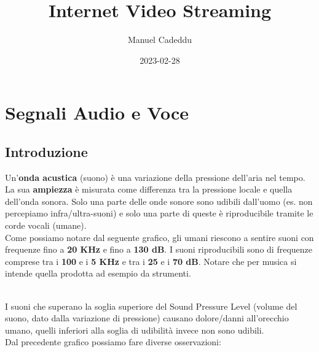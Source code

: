 \documentclass{article}
\title{Internet Video Streaming}
\date{2023-02-28}
\author{Manuel Cadeddu}
\begin{document}
	\maketitle
	\newpage
	\doublespacing
	\tableofcontents
	\singlespacing
	\newpage

	\section{Segnali Audio e Voce}

		\subsection{Introduzione}
			Un'\textbf{onda acustica} (suono) è una variazione della pressione dell'aria nel tempo. La sua \textbf{ampiezza} è misurata come differenza tra la pressione locale e quella dell'onda sonora. Solo una parte delle onde sonore sono udibili dall'uomo (es. non percepiamo infra/ultra-suoni) e solo una parte di queste è riproducibile tramite le corde vocali (umane).
			\\Come possiamo notare dal seguente grafico, gli umani riescono a sentire suoni con frequenze fino a \textbf{20 KHz} e fino a \textbf{130 dB}. I suoni riproducibili sono di frequenze comprese tra i \textbf{100} e i \textbf{5 KHz} e tra i \textbf{25} e i \textbf{70 dB}. Notare che per musica si intende quella prodotta ad esempio da strumenti.
			\begin{figure}[ht!]
			\end{figure}
			\\I suoni che superano la soglia superiore del Sound Pressure Level (volume del suono, dato dalla variazione di pressione) causano dolore/danni all'orecchio umano, quelli inferiori alla soglia di udibilità invece non sono udibili.
			\\Dal precedente grafico possiamo fare diverse osservazioni:
\end{document}
